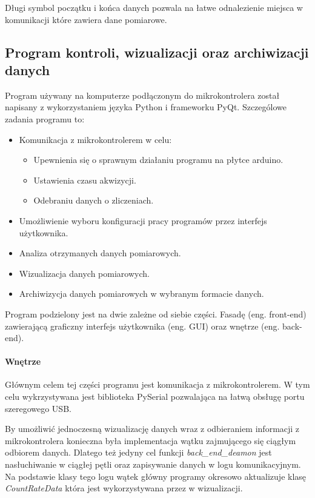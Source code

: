 \documentclass[a4paper,12pt]{article}
\begin{document}
Długi symbol początku i końca danych pozwala na łatwe odnalezienie miejsca w komunikacji które zawiera dane pomiarowe. 

\subsection{Program kontroli, wizualizacji oraz archiwizacji danych}

Program używany na komputerze podłączonym do mikrokontrolera został napisany z wykorzystaniem języka Python i frameworku PyQt.
Szczególowe zadania programu to:
\begin{itemize}
        \item Komunikacja z mikrokontrolerem w celu:
        \begin{itemize}
                \item Upewnienia się o sprawnym działaniu programu na płytce arduino.
                \item Ustawienia czasu akwizycji.
                \item Odebraniu danych o zliczeniach. 
        \end{itemize}
        \item Umożliwienie wyboru konfiguracji pracy programów przez interfejs użytkownika.
        \item Analiza otrzymanych danych pomiarowych.
        \item Wizualizacja danych pomiarowych.
        \item Archiwizycja danych pomiarowych w wybranym formacie danych.
\end{itemize}

Program podzielony jest na dwie zależne od siebie części. Fasadę (eng. front-end) zawierającą graficzny interfejs użytkownika (eng. GUI) oraz wnętrze (eng. back-end).

\paragraph{Wnętrze}

Głównym celem tej części programu jest komunikacja z mikrokontrolerem. 
W tym celu wykrzystywana jest biblioteka PySerial\cite{pyserial} pozwalająca na łatwą obsługę portu szeregowego USB. 

By umożliwić jednoczesną wizualizację danych wraz z odbieraniem informacji z mikrokontrolera konieczna była implementacja wątku zajmującego się ciągłym odbiorem danych. 
Dlatego też jedyny cel funkcji \textit{back\_end\_deamon} jest nasłuchiwanie w ciągłej pętli oraz zapisywanie danych w logu komunikacyjnym. 
Na podstawie klasy tego logu wątek główny programy okresowo aktualizuje klasę \textit{CountRateData} która jest wykorzystywana przez w wizualizacji. 
\end{document}
